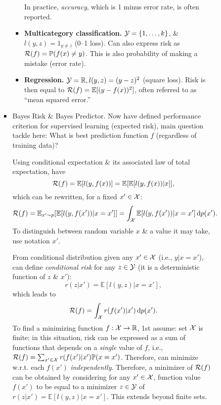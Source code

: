 \documentclass{article}
\begin{document}
\begin{enumerate}
\begin{itemize}
\begin{itemize}
\begin{itemize}
\begin{itemize}
					In practice, {\it accuracy}, which is 1 minus error rate, is often reported.
					\item {\bf Multicategory classification.} ${\cal Y} = \{1,\ldots,k\}$, \& $l(y,z) = 1_{y\ne z}$ (0--1 loss). Can also express risk as ${\cal R}(f) = \mathbb{P}(f(x)\ne y)$. This is also probability of making a mistake (error rate).
					\item {\bf Regression.} ${\cal Y} = \mathbb{R},l(y,z) = (y - z)^2$ (square loss). Risk is then equal to ${\cal R}(f) = \mathbb{E}[(y  -f(x))^2]$, often referred to as ``mean squared error.''
				\end{itemize}
				\item {\sf Bayes Risk \& Bayes Predictor.} Now have defined performance criterion for supervised learning (expected risk), main question tackle here: What is best prediction function $f$ (regardless of training data)?
				
				Using conditional expectation \& its associated law of total expectation, have
				\begin{equation}
					{\cal R}(f) = \mathbb{E}[l(y,f(x))] = \mathbb{E}[\mathbb{E}[l(y,f(x))|x]],
				\end{equation}
				which can be rewritten, for a fixed $x'\in{\cal X}$:
				\begin{equation}
					{\cal R}(f) = \mathbb{E}_{x'\sim p}[\mathbb{E}[l(y,f(x'))|x = x']] = \int_{{\cal X}} \mathbb{E}[l(y,f(x'))|x = x']\,{\rm d}p(x').
				\end{equation}
				To distinguish between random variable $x$ \& a value it may take, use notation $x'$.
				
				From conditional distribution given any $x'\in{\cal X}$ (i.e., $y|x = x'$), can define {\it conditional risk} for any $z\in{\cal Y}$ (it is a deterministic function of $z$ \& $x'$):
				\begin{equation}
					r(z|x') = \mathbb{E}[l(y,z)|x = x'],
				\end{equation}
				which leads to
				\begin{equation}
					{\cal R}(f) = \int_{{\cal X}} r(f(x')|x')\,{\rm d}p(x').
				\end{equation}
				To find a minimizing function $f:{\cal X}\to\mathbb{R}$, 1st assume: set ${\cal X}$ is finite: in this situation, risk can be expressed as a sum of functions that depends on a {\it single} value of $f$, i.e., ${\cal R}(f) = \sum_{x'\in{\cal X}} r(f(x')|x')\mathbb{P}(x = x')$. Therefore, can minimize w.r.t. each $f(x')$ {\it independently}. Therefore, a minimizer of ${\cal R}(f)$ can be obtained by considering for any $x'\in{\cal X}$, function value $f(x')$ to be equal to a minimizer $z\in{\cal Y}$ of $r(z|x') = \mathbb{E}[l(y,z)|x = x']$. This extends beyond finite sets.
				

\end{itemize}
\end{itemize}
\end{itemize}
\end{enumerate}
\end{document}
